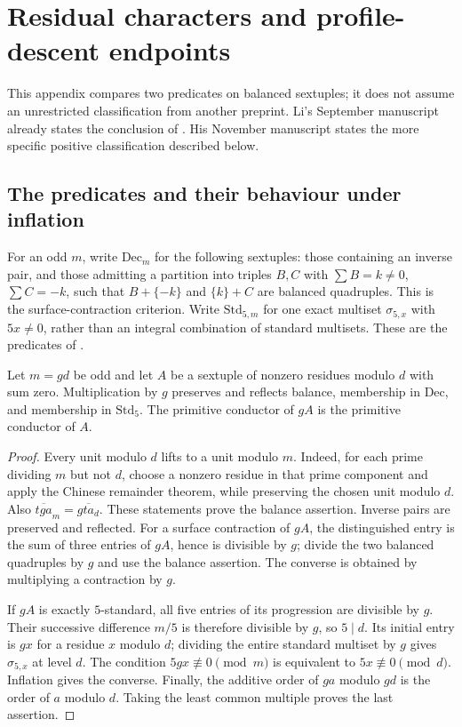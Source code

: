 \section{Residual characters and profile-descent endpoints}
\label{app:li-comparison}

This appendix compares two predicates on balanced sextuples; it does not
assume an unrestricted classification from another preprint. Li's
September manuscript \cite[Theorem~1.1]{Li26a} already states the conclusion
of . His November manuscript \cite[Theorem~A]{Li26b}
states the more specific positive classification described below.

\subsection{The predicates and their behaviour under inflation}
For an odd $m$, write $\mathrm{Dec}_m$ for the following sextuples:
those containing an inverse pair, and those admitting a partition into
triples $B,C$ with $\sum B=k\ne0$, $\sum C=-k$, such that
$B+\{-k\}$ and $\{k\}+C$ are balanced quadruples. This is the
surface-contraction criterion. Write $\mathrm{Std}_{5,m}$ for one
exact multiset $\sigma_{5,x}$ with $5x\ne0$, rather than an integral
combination of standard multisets. These are the predicates of
\cite[\S2.3]{Li26b}.

\begin{lemma}\label{lem:li-inflation}
Let $m=gd$ be odd and let $A$ be a sextuple of nonzero residues modulo
$d$ with sum zero. Multiplication by $g$ preserves and reflects
balance, membership in $\mathrm{Dec}$, and membership in
$\mathrm{Std}_5$. The primitive conductor of $gA$ is the primitive
conductor of $A$.
\end{lemma}
\begin{proof}
Every unit modulo $d$ lifts to a unit modulo $m$. Indeed, for each
prime dividing $m$ but not $d$, choose a nonzero residue in that prime
component and apply the Chinese remainder theorem, while preserving
the chosen unit modulo $d$. Also
$\overline{tga}_{m}=g\overline{ta}_{d}$. These statements prove the
balance assertion. Inverse pairs are preserved and reflected.
For a surface contraction of $gA$, the distinguished entry is the sum
of three entries of $gA$, hence is divisible by $g$; divide the two
balanced quadruples by $g$ and use the balance assertion. The converse
is obtained by multiplying a contraction by $g$.

If $gA$ is exactly $5$-standard, all five entries of its progression
are divisible by $g$. Their successive difference $m/5$ is therefore
divisible by $g$, so $5\mid d$. Its initial entry is $gx$ for a residue
$x$ modulo $d$; dividing the entire standard multiset by $g$ gives
$\sigma_{5,x}$ at level $d$. The condition $5gx\not\equiv0\pmod m$
is equivalent to $5x\not\equiv0\pmod d$. Inflation gives the converse.
Finally, the additive order of $ga$ modulo $gd$ is the order of $a$
modulo $d$. Taking the least common multiple proves the last assertion.
\end{proof}

